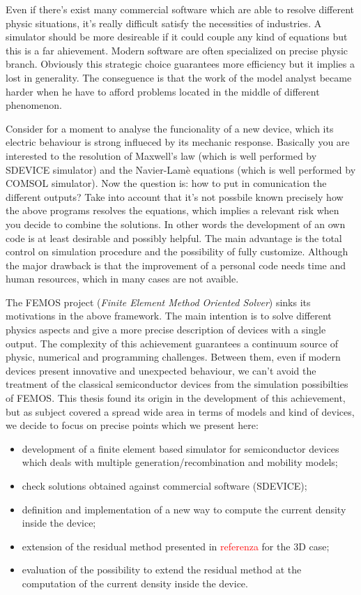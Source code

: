 Even if there's exist many commercial software which are able to resolve different physic situations, it's really difficult satisfy the necessities of industries. A simulator should be more desireable if it  could couple any kind of equations but this is a far ahievement. Modern software are often specialized on precise physic branch. Obviously this strategic choice guarantees more efficiency but it implies a lost in generality. The conseguence is that the work of the model analyst became harder when he have to afford problems located in the middle of different phenomenon. 

Consider for a moment to analyse the funcionality of a new device, which its electric behaviour is strong influeced by its mechanic response. Basically you are interested to the resolution of Maxwell's law  (which is well performed by SDEVICE simulator) and the Navier-Lam\`e equations (which is well performed by COMSOL simulator). Now the question is: how to put in comunication the different outputs?
Take into account that it's not possbile known precisely how the above programs resolves the equations, which implies a relevant risk when you decide to combine the solutions. 
In other words the development of an own code is at least desirable and possibly helpful. The main advantage is the total control on simulation procedure and the possibility of fully customize. Although the major drawback is that the improvement of a personal code needs time and human resources, which in many cases are not avaible.   

The FEMOS project (\textit{Finite Element Method Oriented Solver}) sinks its motivations in the above framework. The main intention is to solve different physics aspects and give a more precise description of devices with a single output. The complexity of this achievement guarantees a continuum source of physic, numerical and programming challenges. 
Between them, even if modern devices present innovative and unexpected behaviour, we can't avoid the treatment of the classical semiconductor devices from the simulation possibilties of FEMOS.
This thesis found its origin in the development of this achievement, but as subject covered a spread wide area in terms of models and kind of devices, we decide to focus on precise points which we present here:
\begin{itemize}
\item development of a finite element based simulator for semiconductor devices which deals with multiple generation/recombination and mobility models;
\item check solutions obtained against commercial software (SDEVICE);
\item definition and implementation of a new way to compute the current density inside the device;
\item extension of the residual method presented in \textcolor{red}{referenza} for the 3D case;
\item evaluation of the possibility to extend the residual method at the computation of the current density inside the device.
\end{itemize}

